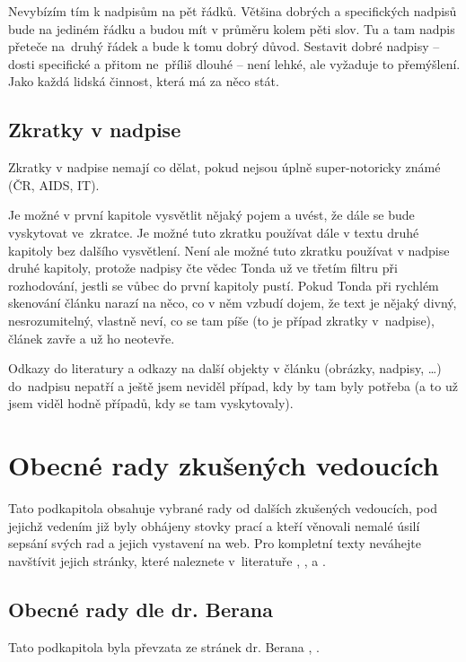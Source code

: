 Nevybízím tím k nadpisům na pět řádků. Většina dobrých a specifických nadpisů bude na jediném řádku a budou mít v průměru kolem pěti slov. Tu a tam nadpis přeteče na~druhý řádek a bude k tomu dobrý důvod. Sestavit dobré nadpisy -- dosti specifické a přitom ne~příliš dlouhé -- není lehké, ale vyžaduje to přemýšlení. Jako každá lidská činnost, která má za něco stát.

\subsection*{Zkratky v nadpise}
Zkratky v nadpise nemají co dělat, pokud nejsou úplně super-notoricky známé (ČR, AIDS, IT).

Je možné v první kapitole vysvětlit nějaký pojem a uvést, že dále se bude vyskytovat ve~zkratce. Je možné tuto zkratku používat dále v textu druhé kapitoly bez dalšího vysvětlení. Není ale možné tuto zkratku používat v nadpise druhé kapitoly, protože nadpisy čte vědec Tonda už ve třetím filtru při rozhodování, jestli se vůbec do první kapitoly pustí. Pokud Tonda při rychlém skenování článku narazí na něco, co v něm vzbudí dojem, že text je nějaký divný, nesrozumitelný, vlastně neví, co se tam píše (to je případ zkratky v~nadpise), článek zavře a už ho neotevře.

Odkazy do literatury a odkazy na další objekty v článku (obrázky, nadpisy, \ldots) do~nadpisu nepatří a ještě jsem neviděl případ, kdy by tam byly potřeba (a to už jsem viděl hodně případů, kdy se tam vyskytovaly).

\section{Obecné rady zkušených vedoucích}

Tato podkapitola obsahuje vybrané rady od dalších zkušených vedoucích, pod jejichž vedením již byly obhájeny stovky prací a kteří věnovali nemalé úsilí sepsání svých rad a jejich vystavení na web. Pro kompletní texty neváhejte navštívit jejich stránky, které naleznete v~literatuře \cite{Beran}, \cite{BeranPDF}, \cite{Cernocky} a \cite{Zemcik}.

\subsection*{Obecné rady dle dr. Berana}
Tato podkapitola byla převzata ze stránek dr. Berana \cite{Beran}, \cite{BeranPDF}.

